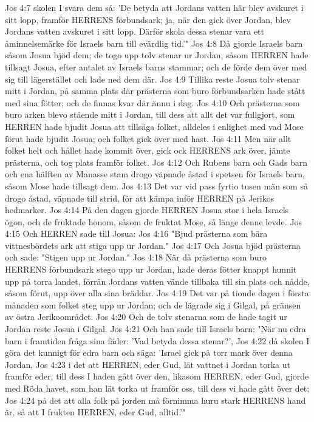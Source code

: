 Jos 4:7  skolen I svara dem så: 'De betyda att Jordans vatten här blev avskuret i sitt lopp, framför HERRENS förbundsark; ja, när den gick över Jordan, blev Jordans vatten avskuret i sitt lopp. Därför skola dessa stenar vara ett åminnelsemärke för Israels barn till evärdlig tid.'"
Jos 4:8  Då gjorde Israels barn såsom Josua bjöd dem; de togo upp tolv stenar ur Jordan, såsom HERREN hade tillsagt Josua, efter antalet av Israels barns stammar; och de förde dem över med sig till lägerstället och lade ned dem där.
Jos 4:9  Tillika reste Josua tolv stenar mitt i Jordan, på samma plats där prästerna som buro förbundsarken hade stått med sina fötter; och de finnas kvar där ännu i dag.
Jos 4:10  Och prästerna som buro arken blevo stående mitt i Jordan, till dess att allt det var fullgjort, som HERREN hade bjudit Josua att tillsäga folket, alldeles i enlighet med vad Mose förut hade bjudit Josua; och folket gick över med hast.
Jos 4:11  Men när allt folket helt och hållet hade kommit över, gick ock HERRENS ark över, jämte prästerna, och tog plats framför folket.
Jos 4:12  Och Rubens barn och Gads barn och ena hälften av Manasse stam drogo väpnade åstad i spetsen för Israels barn, såsom Mose hade tillsagt dem.
Jos 4:13  Det var vid pass fyrtio tusen män som så drogo åstad, väpnade till strid, för att kämpa inför HERREN på Jerikos hedmarker.
Jos 4:14  På den dagen gjorde HERREN Josua stor i hela Israels ögon, och de fruktade honom, såsom de fruktat Mose, så länge denne levde.
Jos 4:15  Och HERREN sade till Josua:
Jos 4:16  "Bjud prästerna som bära vittnesbördets ark att stiga upp ur Jordan."
Jos 4:17  Och Josua bjöd prästerna och sade: "Stigen upp ur Jordan."
Jos 4:18  När då prästerna som buro HERRENS förbundsark stego upp ur Jordan, hade deras fötter knappt hunnit upp på torra landet, förrän Jordans vatten vände tillbaka till sin plats och nådde, såsom förut, upp över alla sina bräddar.
Jos 4:19  Det var på tionde dagen i första månaden som folket steg upp ur Jordan; och de lägrade sig i Gilgal, på gränsen av östra Jerikoområdet.
Jos 4:20  Och de tolv stenarna som de hade tagit ur Jordan reste Josua i Gilgal.
Jos 4:21  Och han sade till Israels barn: "När nu edra barn i framtiden fråga sina fäder: 'Vad betyda dessa stenar?',
Jos 4:22  då skolen I göra det kunnigt för edra barn och säga: 'Israel gick på torr mark över denna Jordan,
Jos 4:23  i det att HERREN, eder Gud, lät vattnet i Jordan torka ut framför eder, till dess I haden gått över den, likasom HERREN, eder Gud, gjorde med Röda havet, som han lät torka ut framför oss, till dess vi hade gått över det;
Jos 4:24  på det att alla folk på jorden må förnimma huru stark HERRENS hand är, så att I frukten HERREN, eder Gud, alltid.'"
